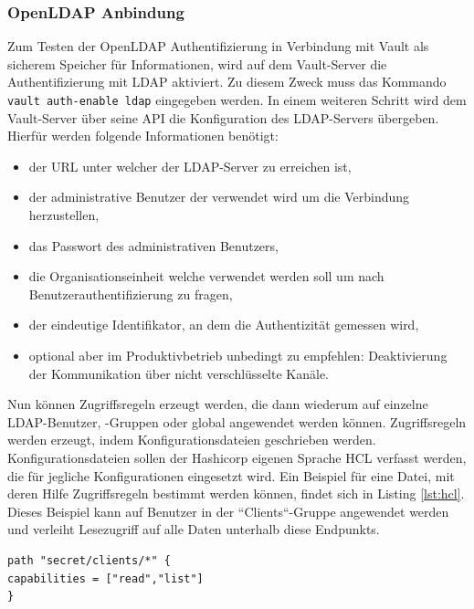\documentclass[
book,
a4paper,   
titlepage,  
halfparskip,
12pt        
]{scrartcl}
\newcommand\inline{\lstinline[basicstyle=\ttfamily]}
\begin{document}
\begin{onehalfspacing}
\subsubsection{OpenLDAP Anbindung}
Zum Testen der OpenLDAP Authentifizierung in Verbindung mit Vault als sicherem Speicher für Informationen, wird auf dem Vault-Server die Authentifizierung mit \ac{LDAP} aktiviert. Zu diesem Zweck muss das Kommando \inline|vault auth-enable ldap| eingegeben werden. In einem weiteren Schritt wird dem Vault-Server über seine \ac{API} die Konfiguration des LDAP-Servers übergeben. Hierfür werden folgende Informationen benötigt\cite{vaultapi}:
\begin{itemize}
	\item der \ac{URL} unter welcher der LDAP-Server zu erreichen ist,
	\item der administrative Benutzer der verwendet wird um die Verbindung herzustellen,
	\item das Passwort des administrativen Benutzers,
	\item die Organisationseinheit welche verwendet werden soll um nach Benutzerauthentifizierung zu fragen,
	\item der eindeutige Identifikator, an dem die Authentizität gemessen wird,
	\item optional aber im Produktivbetrieb unbedingt zu empfehlen: Deaktivierung der Kommunikation über nicht verschlüsselte Kanäle.
\end{itemize} 
Nun können Zugriffsregeln erzeugt werden, die dann wiederum auf einzelne \ac{LDAP}-Benutzer, -Gruppen oder global angewendet werden können. Zugriffsregeln werden erzeugt, indem Konfigurationsdateien geschrieben werden.\\
Konfigurationsdateien sollen der Hashicorp eigenen Sprache \ac{HCL} verfasst werden, die für jegliche Konfigurationen eingesetzt wird. Ein Beispiel für eine Datei, mit deren Hilfe Zugriffsregeln bestimmt werden können, findet sich in Listing \vref{lst:hcl}. Dieses Beispiel kann auf Benutzer in der ``Clients``-Gruppe angewendet werden und verleiht Lesezugriff auf alle Daten unterhalb diese Endpunkts.\cite{vaultldap}
\newline

\begin{lstlisting}[caption={[Beispiel \acs{HCL}] Beispiel für eine Konfigurationsdatei im \ac{HCL}-Format\cite{vaultpol}}, label=lst:hcl, captionpos=b, basicstyle=\ttfamily] 
path "secret/clients/*" {
capabilities = ["read","list"]
}
\end{lstlisting}


\end{onehalfspacing}
\end{document}
